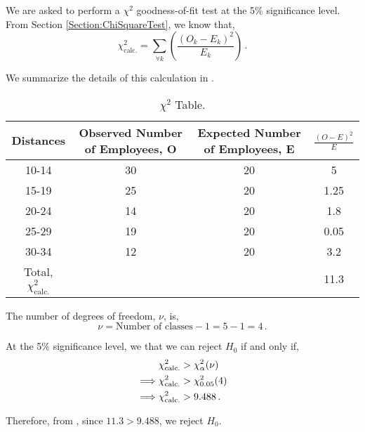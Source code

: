 \begin{subquestions}
\begin{subsubquestions}

\subsubquestion
We are asked to perform a $\chi^2$ goodness-of-fit test at the 5\% significance level. From Section \ref{Section:ChiSquareTest}, we know that,
\begin{equation}
	\chi^2_{\text{calc.}} = \sum_{\forall k} \left( \frac{(O_k-E_k)^2}{E_k}\right) \,.
\end{equation}

We summarize the details of this calculation in .
\begin{table}[H]
	\centering
	\begin{tabular}{|c|c|c|c|}
		\hline
		Distances & Observed Number of Employees, O & Expected Number of Employees, E & $\frac{(O-E)^2}{E}$\\
		\hline 
		10-14 & 30 & 20 & 5 \\
		15-19 & 25 & 20 & 1.25 \\
		20-24 & 14 & 20 & 1.8 \\
		25-29 & 19 & 20 & 0.05 \\
		30-34 & 12 & 20 & 3.2 \\
		\hline
		Total, $\chi^2_{\text{calc.}}$ & & & 11.3 \\
		\hline
	\end{tabular}
	\caption{\label{2010:q4:ChiTab} $\chi^2$ Table.}
\end{table}	

The number of degrees of freedom, $\nu$, is,
\begin{equation}
	\nu = \text{Number of classes}-1 = 5-1 = 4\,.
\end{equation}

At the 5\% significance level, we that we can reject $H_0$ if and only if,
\begin{align}
	&\chi^2_{\text{calc.}} > \chi^2_{\alpha}(\nu) \nonumber \\
	\implies & \chi^2_{\text{calc.}} > \chi^2_{0.05}(4) \nonumber \\
	\implies & \chi^2_{\text{calc.}} > 9.488 \,.
\end{align} 

Therefore, from , since $11.3>9.488$, we reject $H_0$.
\end{subsubquestions}

\end{subquestions}
